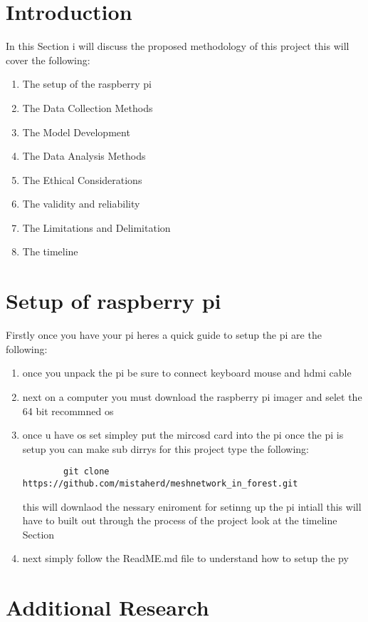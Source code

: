 
\section{Introduction}
In this  Section  i will discuss the  proposed  methodology of this  project this will cover the  following:
\begin{enumerate}
    \item The setup of the raspberry pi
    \item The Data Collection Methods
    \item The Model Development
    \item The Data Analysis Methods
    \item The Ethical Considerations
    \item The validity and reliability 
    \item The Limitations and Delimitation
    \item The timeline
\end{enumerate} 
\section{Setup of raspberry pi}
Firstly once you have  your pi  heres  a  quick  guide to setup the pi are  the following:
\begin{enumerate}
    \item once you unpack the  pi be sure  to  connect keyboard mouse  and hdmi cable
    \item next on a computer you must download the  raspberry pi imager and  selet the  64 bit  recommned os 
    \item once u have os set simpley put the  mircosd card  into  the pi once the  pi is  setup you can make sub dirrys for this project type the  following:
    \begin{verbatim}
        git clone https://github.com/mistaherd/meshnetwork_in_forest.git
    \end{verbatim}
    this  will downlaod the  nessary  eniroment for  setinng up the  pi  intiall this will have to built out  through the  process of  the   project look at the timeline Section
    \item next simply follow the ReadME.md file  to  understand  how  to setup the py
\end{enumerate}



\section{Additional  Research}


